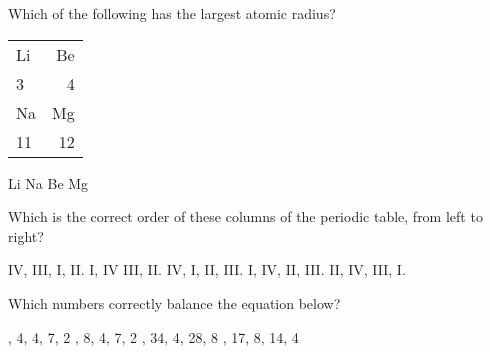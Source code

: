 \documentclass[11pt]{exam}
\begin{document}
\begin{questions}
\question Which of the following has the largest atomic radius?

\hspace{.5cm}
\begin{tabular}{ | l | r | }
    \hline
    Li & Be \\ 
    3 & 4 \\ \hline
    Na & Mg \\ 
    11 & 12 \\ \hline
\end{tabular}

\begin{choices}
    \choice Li
    \choice Na
    \choice Be
    \choice Mg
\end{choices}
\answerline

\question Which is the correct order of these columns of the periodic table, from left to right?

\hspace{.5cm}

\begin{choices}
    \choice IV, III, I, II.
    \choice I, IV III, II.
    \choice IV, I, II, III.
    \choice I, IV, II, III.
    \choice II, IV, III, I.
\end{choices}
\answerline

\question Which numbers correctly balance the equation below?

\hspace{.5cm}

\begin{choices}
    , 4, 4, 7, 2
    , 8, 4, 7, 2
    , 34, 4, 28, 8
    , 17, 8, 14, 4 
\end{choices}
\answerline

\end{questions}
\end{document}
